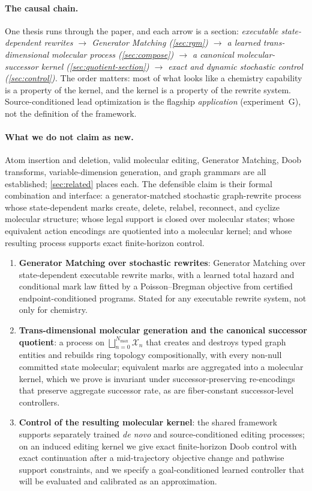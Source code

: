 \documentclass{article}
\newcommand{\X}{\mathcal{X}}
\theoremstyle{definition}
\theoremstyle{remark}
\begin{document}
\paragraph{The causal chain.}
One thesis runs through the paper, and each arrow is a section: \emph{executable state-dependent rewrites $\to$ Generator Matching (\cref{sec:rgm}) $\to$ a learned trans-dimensional molecular process (\cref{sec:compose}) $\to$ a canonical molecular-successor kernel (\cref{sec:quotient-section}) $\to$ exact and dynamic stochastic control (\cref{sec:control}).} The order matters: most of what looks like a chemistry capability is a property of the kernel, and the kernel is a property of the rewrite system. Source-conditioned lead optimization is the flagship \emph{application} (experiment~G), not the definition of the framework.

\paragraph{What we do not claim as new.}
Atom insertion and deletion, valid molecular editing, Generator Matching, Doob transforms, variable-dimension generation, and graph grammars are all established; \cref{sec:related} places each. The defensible claim is their formal combination and interface: a generator-matched stochastic graph-rewrite process whose state-dependent marks create, delete, relabel, reconnect, and cyclize molecular structure; whose legal support is closed over molecular states; whose equivalent action encodings are quotiented into a molecular kernel; and whose resulting process supports exact finite-horizon control.

\begin{enumerate}[leftmargin=*,topsep=2pt,itemsep=1pt]
    \item \textbf{Generator Matching over stochastic rewrites}: Generator Matching over state-dependent executable rewrite marks, with a learned total hazard and conditional mark law fitted by a Poisson--Bregman objective from certified endpoint-conditioned programs. Stated for any executable rewrite system, not only for chemistry.
    \item \textbf{Trans-dimensional molecular generation and the canonical successor quotient}: a process on $\bigsqcup_{n=0}^{N_{\max}}\X_n$ that creates and destroys typed graph entities and rebuilds ring topology compositionally, with every non-null committed state molecular; equivalent marks are aggregated into a molecular kernel, which we prove is invariant under successor-preserving re-encodings that preserve aggregate successor rate, as are fiber-constant successor-level controllers.
    \item \textbf{Control of the resulting molecular kernel}: the shared framework supports separately trained \emph{de novo} and source-conditioned editing processes; on an induced editing kernel we give exact finite-horizon Doob control with exact continuation after a mid-trajectory objective change and pathwise support constraints, and we specify a goal-conditioned learned controller that will be evaluated and calibrated as an approximation.
\end{enumerate}
\end{document}

